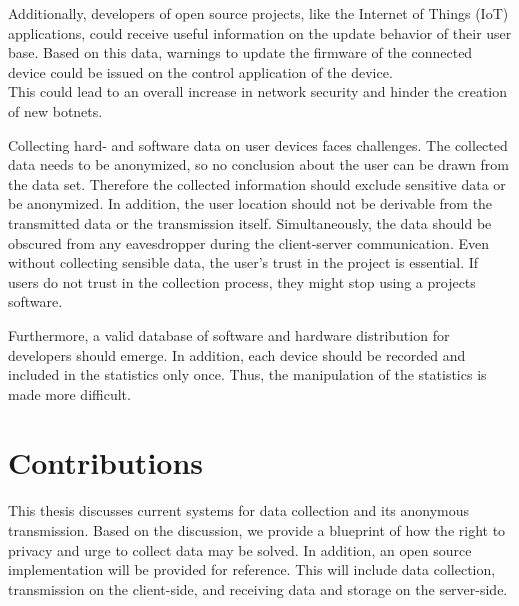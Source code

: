 Additionally, developers of open source projects, like the Internet of Things (IoT) applications, could receive useful
information on the update behavior of their user base. Based on this data, warnings to update the firmware of the
connected device could be issued on the control application of the device.\\
This could lead to an overall increase in network security and hinder the creation of new botnets.\\

\newpage

Collecting hard- and software data on user devices faces challenges. The collected data needs to be anonymized,
so no conclusion about the user can be drawn from the data set. Therefore the collected information should exclude
sensitive data or be anonymized. 
In addition, the user location should not be derivable from the transmitted data or the transmission itself. Simultaneously, the data should be obscured from any eavesdropper during the client-server communication. Even without collecting sensible data, the user's trust in the project is essential. If users do not trust in the collection process, they might stop using a projects software.

Furthermore, a valid database of software and hardware distribution for developers should emerge. In addition,
each device should be recorded and included in the statistics only once.
Thus, the manipulation of the statistics is made more difficult.



\section{Contributions}
\label{sec:intro:contrib}
%

This thesis discusses current systems for data collection and its anonymous transmission. Based on the discussion, we provide a blueprint of how the right to privacy and urge to collect data may be solved.
In addition, an open source implementation will be provided for reference.
This will include data collection, transmission on the client-side, and receiving data and storage on the server-side.

